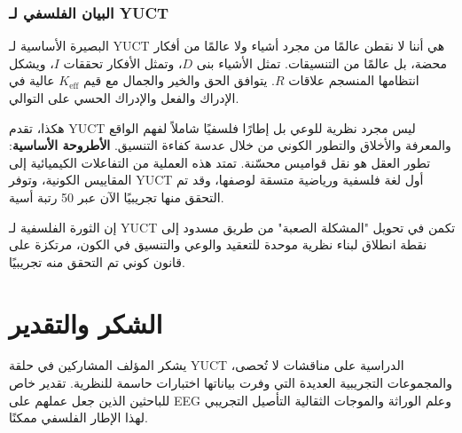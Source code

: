 \documentclass[12pt,a4paper]{article}
\newcommand{\eff}{\mathrm{eff}}
\newcommand{\Ke}{K_{\eff}}
\begin{document}
	\subsubsection{البيان الفلسفي لـ YUCT}
	
	البصيرة الأساسية لـ YUCT هي أننا لا نقطن عالمًا من مجرد أشياء ولا عالمًا من أفكار محضة، بل عالمًا من التنسيقات. تمثل الأشياء بنى $D$، وتمثل الأفكار تحققات $I$، ويشكل انتظامها المنسجم علاقات $R$. يتوافق الحق والخير والجمال مع قيم \(\Ke\) عالية في الإدراك والفعل والإدراك الحسي على التوالي.
	
	هكذا، تقدم YUCT ليس مجرد نظرية للوعي بل إطارًا فلسفيًا شاملاً لفهم الواقع والمعرفة والأخلاق والتطور الكوني من خلال عدسة كفاءة التنسيق.
	\textbf{الأطروحة الأساسية}: تطور العقل هو نقل قواميس محسّنة. تمتد هذه العملية من التفاعلات الكيميائية إلى المقاييس الكونية، وتوفر YUCT أول لغة فلسفية ورياضية متسقة لوصفها، وقد تم التحقق منها تجريبيًا الآن عبر 50 رتبة أسية.
	
	إن الثورة الفلسفية لـ YUCT تكمن في تحويل "المشكلة الصعبة" من طريق مسدود إلى نقطة انطلاق لبناء نظرية موحدة للتعقيد والوعي والتنسيق في الكون، مرتكزة على قانون كوني تم التحقق منه تجريبيًا.
	
	\section*{الشكر والتقدير}
	
	يشكر المؤلف المشاركين في حلقة YUCT الدراسية على مناقشات لا تُحصى، والمجموعات التجريبية العديدة التي وفرت بياناتها اختبارات حاسمة للنظرية. تقدير خاص للباحثين الذين جعل عملهم على EEG وعلم الوراثة والموجات الثقالية التأصيل التجريبي لهذا الإطار الفلسفي ممكنًا.
	
\end{document}
